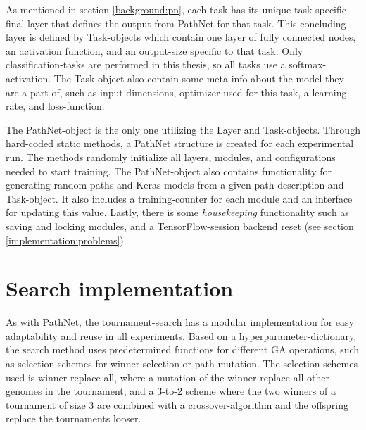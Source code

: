 As mentioned in section \ref{background:pn}, each task has its unique task-specific final layer that defines the output from PathNet for that task. This concluding layer is defined by Task-objects which contain one layer of fully connected nodes, an activation function, and an output-size specific to that task. Only classification-tasks are performed in this thesis, so all tasks use a softmax-activation. The Task-object also contain some meta-info about the model they are a part of, such as input-dimensions, optimizer used for this task, a learning-rate, and loss-function. 

The PathNet-object is the only one utilizing the Layer and Task-objects. Through hard-coded static methods, a PathNet structure is created for each experimental run. The methods randomly initialize all layers, modules, and configurations needed to start training. The PathNet-object also contains functionality for generating random paths and Keras-models from a given path-description and Task-object. It also includes a training-counter for each module and an interface for updating this value. Lastly, there is some \textit{housekeeping} functionality such as saving and locking modules, and a TensorFlow-session backend reset (see section \ref{implementation:problems}).

\section{Search implementation}
\label{implementation.search}
As with PathNet, the tournament-search has a modular implementation for easy adaptability and reuse in all experiments. Based on a hyperparameter-dictionary, the search method uses predetermined functions for different GA operations, such as selection-schemes for winner selection or path mutation. The selection-schemes used is winner-replace-all, where a mutation of the winner replace all other genomes in the tournament, and a 3-to-2 scheme where the two winners of a tournament of size 3 are combined with a crossover-algorithm and the offspring replace the tournaments looser.


